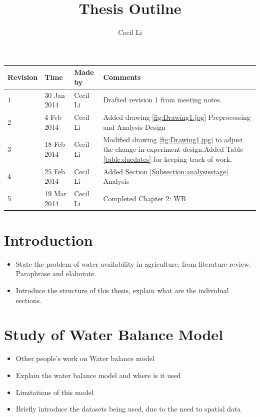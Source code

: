 \documentclass[12pt,journal,compsoc,onecolumn]{IEEEtran}
\begin{document}
\title{Thesis Outilne}
\author{Cecil Li}

\maketitle
\begin{center}
    \begin{tabular}{ | l | l | l | p{8cm} |}
    \hline
    Revision & Time & Made by & Comments \\ \hline
    1 & 30 Jan 2014 & Cecil Li & Drafted revision 1 from meeting notes.\\ \hline
    2 & 4 Feb 2014 & Cecil Li & Added drawing \ref{fig:Drawing1.jpg} Preprocessing and Analysis Design\\ \hline
    3 & 18 Feb 2014 & Cecil Li & Modified drawing \ref{fig:Drawing1.jpg} to adjust the change in experiment design.\newline    Added Table \ref{table:duedates} for keeping track of work.\\ \hline
    4 & 25 Feb 2014 & Cecil Li & Added Section \ref{Subsection:analysisstage} Analysis \\ \hline
    5 & 19 Mar 2014 & Cecil Li & Completed Chapter 2: WB \\ \hline
    \end{tabular}
\end{center}
\newpage
\section{Introduction}
\begin{itemize}
\item
State the problem of water availability in agriculture, from literature review. Paraphrase and elaborate.
\item
Introduce the structure of this thesis, explain what are the individual sections.
\end{itemize}

\section{Study of Water Balance Model}
\begin{itemize}
\item
Other people's work on Water balance model
\item
Explain the water balance model and where is it used
\item
Limitations of this model
\item
Briefly introduce the datasets being used, due to the need to spatial data
\end{itemize}
\end{document}
